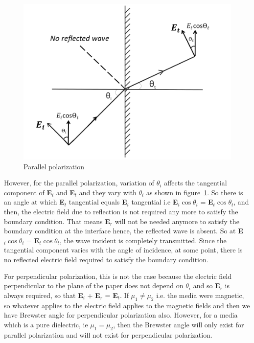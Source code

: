 \begin{figure}[h]
\centering
\includegraphics[width=1\linewidth]{graphics/No_reflection}
\caption{Parallel polarization}
\label{fig:mcben2}
\end{figure}	

However, for the parallel polarization, variation of $\theta_i$ affects the tangential component of \textbf{E}$_i$ and \textbf{E}$_t$ and they vary with $\theta_i$ as shown in figure~\ref{fig:mcben2}. So there is an angle at which \textbf{E}$_t$ tangential equals \textbf{E}$_i$ tangential i.e \textbf{E}$_i\cos\theta_i$ = \textbf{E}$_t\cos\theta_t$, and then, the electric field due to reflection is not required any more to satisfy the boundary condition. That means \textbf{E}$_r$ will not be needed anymore to satisfy the boundary condition at the interface hence, the reflected wave is absent. So at \textbf{E}$_i\cos\theta_i$ = \textbf{E}$_t\cos\theta_t$, the wave incident is completely transmitted. Since the tangential component varies with the angle of incidence, at some point, there is no reflected electric field required to satisfy the boundary condition.

For perpendicular polarization, this is not the case because the electric field perpendicular to the plane of the paper does not depend on $\theta_i$ and so \textbf{E}$_r$ is always required, so that \textbf{E}$_i$ + \textbf{E}$_r$ = \textbf{E}$_t$. If $\mu_1 \neq \mu_2$ i.e. the media were magnetic, so whatever applies to the electric field applies to the magnetic fields and then we have Brewster angle for perpendicular polarization also. However, for a media which is a pure dielectric, ie $\mu_1 = \mu_2$, then the Brewster angle will only exist for parallel polarization and will not exist for perpendicular polarization.

